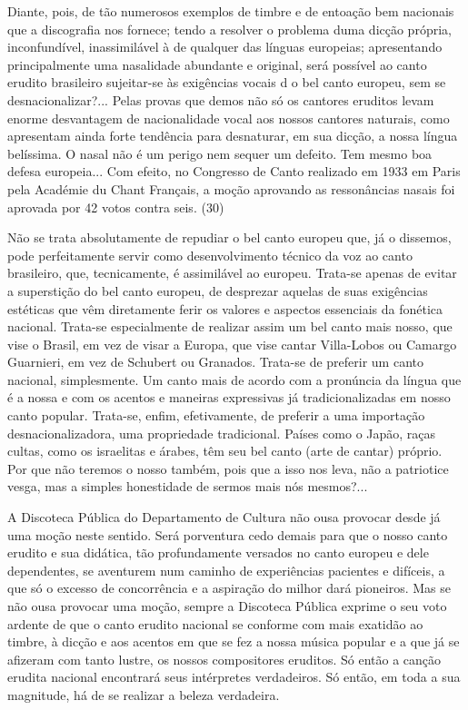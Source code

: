 Diante, pois, de tão numerosos exemplos de timbre e de entoação bem
nacionais que a discografia nos fornece; tendo a resolver o problema
duma dicção própria, inconfundível, inassimilável à de qualquer das
línguas europeias; apresentando principalmente uma nasalidade abundante
e original, será possível ao canto erudito brasileiro sujeitar-se às
exigências vocais d o bel canto europeu, sem se desnacionalizar?...
Pelas provas que demos não só os cantores eruditos levam enorme
desvantagem de nacionalidade vocal aos nossos cantores naturais, como
apresentam ainda forte tendência para desnaturar, em sua dicção, a nossa
língua belíssima. O nasal não é um perigo nem sequer um defeito. Tem
mesmo boa defesa europeia... Com efeito, no Congresso de Canto realizado
em 1933 em Paris pela Académie du Chant Français, a moção aprovando as
ressonâncias nasais foi aprovada por 42 votos contra seis. (30)

Não se trata absolutamente de repudiar o bel canto europeu que, já o
dissemos, pode perfeitamente servir como desenvolvimento técnico da voz
ao canto brasileiro, que, tecnicamente, é assimilável ao europeu.
Trata-se apenas de evitar a superstição do bel canto europeu, de
desprezar aquelas de suas exigências estéticas que vêm diretamente ferir
os valores e aspectos essenciais da fonética nacional. Trata-se
especialmente de realizar assim um bel canto mais nosso, que vise o
Brasil, em vez de visar a Europa, que vise cantar Villa-Lobos ou Camargo
Guarnieri, em vez de Schubert ou Granados. Trata-se de preferir um canto
nacional, simplesmente. Um canto mais de acordo com a pronúncia da
língua que é a nossa e com os acentos e maneiras expressivas já
tradicionalizadas em nosso canto popular. Trata-se, enfim, efetivamente,
de preferir a uma importação desnacionalizadora, uma propriedade
tradicional. Países como o Japão, raças cultas, como os israelitas e
árabes, têm seu bel canto (arte de cantar) próprio. Por que não teremos
o nosso também, pois que a isso nos leva, não a patriotice vesga, mas a
simples honestidade de sermos mais nós mesmos?...

A Discoteca Pública do Departamento de Cultura não ousa provocar desde
já uma moção neste sentido. Será porventura cedo demais para que o nosso
canto erudito e sua didática, tão profundamente versados no canto
europeu e dele dependentes, se aventurem num caminho de experiências
pacientes e difíceis, a que só o excesso de concorrência e a aspiração
do milhor dará pioneiros. Mas se não ousa provocar uma moção, sempre a
Discoteca Pública exprime o seu voto ardente de que o canto erudito
nacional se conforme com mais exatidão ao timbre, à dicção e aos acentos
em que se fez a nossa música popular e a que já se afizeram com tanto
lustre, os nossos compositores eruditos. Só então a canção erudita
nacional encontrará seus intérpretes verdadeiros. Só então, em toda a
sua magnitude, há de se realizar a beleza verdadeira.

